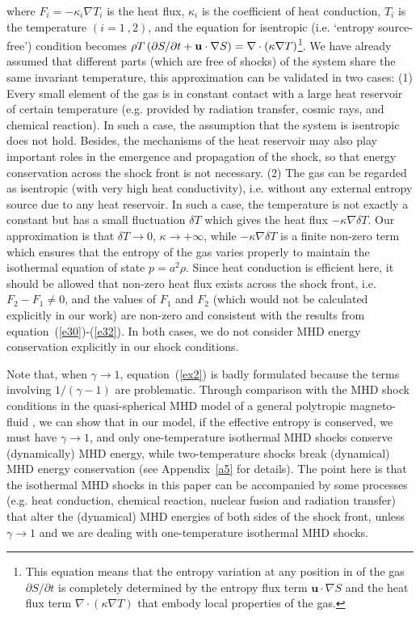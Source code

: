 \documentclass[fleqn,usenatbib]{mnras}
\begin{document}
where $F_{i}=-\kappa_{i} \nabla T_{i}$ is the heat flux, $\kappa_{i}$ is the coefficient of heat conduction, $T_{i}$ is the temperature $(i=1\ ,2)$, and the equation for isentropic (i.e. `entropy source-free') condition becomes $\rho T\left(\partial S/\partial t+{\bf{u}} \cdot\nabla S\right)=\nabla\cdot \left(\kappa\nabla T\right)$\footnote{This equation means that the entropy variation at any position in of the gas $\partial S/\partial t$ is completely determined by the entropy flux term $\mathbf{u}\cdot \nabla S$ and the heat flux term $\nabla\cdot \left(\kappa\nabla T\right)$ that embody local properties of the gas.}. We have already assumed that different parts (which are free of shocks) of the system share the same invariant temperature, this approximation can be validated in two cases: (1) Every small element of the gas is in constant contact with a large heat reservoir of certain temperature (e.g. provided by radiation transfer, cosmic rays, and chemical reaction). In such a case, the assumption that the system is isentropic does not hold. Besides, the mechanisms of the heat reservoir may also play important roles in the emergence and propagation of the shock, so that energy conservation across the shock front is not necessary. (2) The gas can be regarded as isentropic (with very high heat conductivity), i.e. without any external entropy source due to any heat reservoir. In such a case, the temperature is not exactly a constant but has a small fluctuation $\delta T$ which gives the heat flux $-\kappa \nabla \delta T$. Our approximation is that $\delta T\rightarrow 0$, $\kappa\rightarrow+\infty$, while $-\kappa \nabla \delta T$ is a finite non-zero term which ensures that the entropy of the gas varies properly to maintain the isothermal equation of state $p=a^{2}\rho$. Since heat conduction is efficient here, it should be allowed that non-zero heat flux exists across the shock front, i.e. $F_{2}-F_{1}\neq 0$, and the values of $F_{1}$ and $F_{2}$ (which would not be calculated explicitly in our work) are non-zero and consistent with the results from equation~(\ref{e30})-(\ref{e32}). In both cases, we do not consider MHD energy conservation explicitly in our shock conditions.

Note that, when $\gamma\rightarrow 1$, equation~(\ref{ex2}) is badly formulated because the terms involving $1/(\gamma-1)$ are problematic. Through comparison with the MHD shock conditions in the quasi-spherical MHD model of a general polytropic magneto-fluid \citep{wang2008dynamic}, we can show that in our model, if the effective entropy is conserved, we must have $\gamma\rightarrow 1$, and only one-temperature isothermal MHD shocks conserve (dynamically) MHD energy, while two-temperature shocks break (dynamical) MHD energy conservation (see Appendix~\ref{a5} for details). The point here is that the isothermal MHD shocks in this paper can be accompanied by some processes (e.g. heat conduction, chemical reaction, nuclear fusion and radiation transfer) that alter the (dynamical) MHD energies of both sides of the shock front, unless $\gamma\rightarrow 1$ and we are dealing with one-temperature isothermal MHD shocks.
\end{document}
